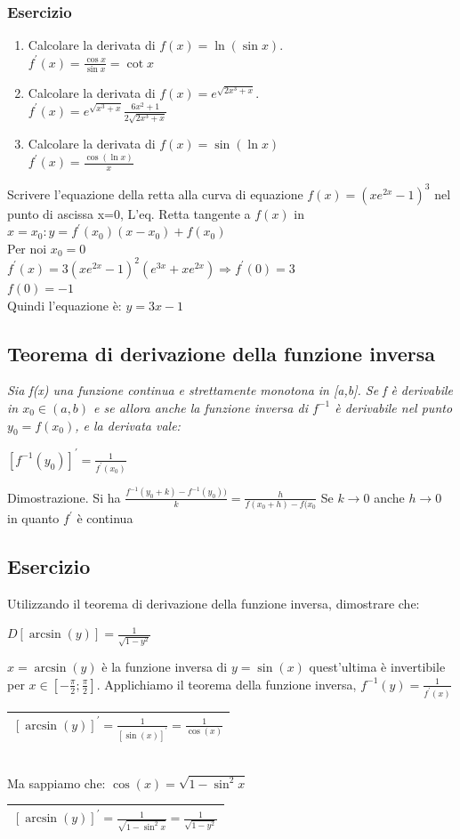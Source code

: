 \subsubsection{Esercizio}
\begin{enumerate}
	\item Calcolare la derivata di $f(x)=\ln(\sin x)$.\\
		$f^\prime (x)=\frac{\cos x}{\sin x}=\cot{x}$
	\item Calcolare la derivata di $f(x)=e^{\sqrt{2x^3+x}}.$\\
		$f^\prime (x)=e^{\sqrt{x^3+x}}\frac{6x^2+1}{2\sqrt{2x^3+x}}$
	\item Calcolare la derivata di $f(x)=\sin(\ln x)$\\
		$f^\prime (x)=\frac{\cos(\ln x)}{x}$
\end{enumerate}
Scrivere l'equazione della retta alla curva di equazione $f(x)=(xe^{2x}-1)^3$
nel punto di ascissa x=0, L'eq. Retta tangente a $f(x)$ in $x=x_0:
y=f^\prime(x_0)(x-x_0)+f(x_0)$\\
Per noi $x_0=0$\\
$f^\prime(x)=3(xe^{2x}-1)^2(e^{3x}+xe^{2x})\Rightarrow f^\prime (0)=3$\\
$f(0)=-1$\\
Quindi l'equazione è: $y=3x-1$
\subsection{Teorema di derivazione della funzione inversa}
\textit{Sia f(x) una funzione continua e strettamente monotona in [a,b]. Se f è
derivabile in $x_0\in(a,b)$ e se allora anche la funzione inversa di $f^{-1}$ è
derivabile nel punto $y_0=f(x_0)$, e la derivata vale:}
\begin{center}
	$[f^{-1}(y_0)]^\prime=\frac{1}{f^\prime(x_0)}$
\end{center}
Dimostrazione. Si ha
$\frac{f^{-1}(y_0+k)-f^{-1}(y_0))}{k}=\frac{h}{f(x_0+h)-f(x_0}$
Se $k\to 0$ anche $h\to0$ in quanto $f^\prime$ è continua
\subsection{Esercizio}
Utilizzando il teorema di derivazione della funzione inversa, dimostrare che:
\begin{center}
	$D[\arcsin(y)]=\frac{1}{\sqrt{1-y^2}}$
\end{center}
$x=\arcsin(y)$ è la funzione inversa di $y=\sin(x)$ quest'ultima è invertibile
per $x\in [-\frac{\pi}{2};\frac{\pi}{2}]$. Applichiamo il teorema della
funzione inversa, $f^{-1}(y)=\frac{1}{f^\prime(x)}$\\
\begin{tabular}{|l|}
	\hline
	$[\arcsin(y)]^\prime=\frac{1}{[\sin(x)]^\prime}=\frac{1}{\cos(x)}$\\\hline
\end{tabular}\\
Ma sappiamo che: $\cos(x)=\sqrt{1-\sin^2x}$\\
\begin{tabular}{|l|}
	\hline
	$[\arcsin(y)]^\prime=\frac{1}{\sqrt{1-\sin^2x}}=\frac{1}{\sqrt{1-y^2}}$\\\hline
\end{tabular}
